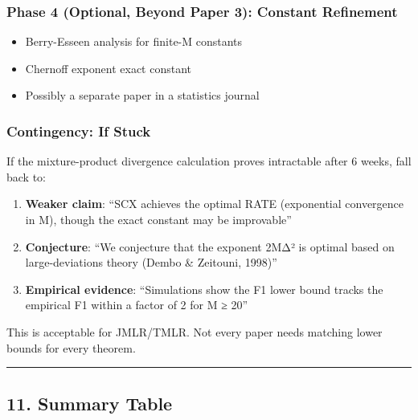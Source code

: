 \documentclass[
  12pt,
]{ctexart}
\providecommand{\tightlist}{%
  \setlength{\itemsep}{0pt}\setlength{\parskip}{0pt}}
\begin{document}
\subsubsection{Phase 4 (Optional, Beyond Paper 3): Constant
Refinement}\label{phase-4-optional-beyond-paper-3-constant-refinement}

\begin{itemize}
\tightlist
\item
  Berry-Esseen analysis for finite-M constants
\item
  Chernoff exponent exact constant
\item
  Possibly a separate paper in a statistics journal
\end{itemize}

\subsubsection{Contingency: If Stuck}\label{contingency-if-stuck}

If the mixture-product divergence calculation proves intractable after 6
weeks, fall back to:

\begin{enumerate}
\def\labelenumi{\arabic{enumi}.}
\tightlist
\item
  \textbf{Weaker claim}: ``SCX achieves the optimal RATE (exponential
  convergence in M), though the exact constant may be improvable''
\item
  \textbf{Conjecture}: ``We conjecture that the exponent 2MΔ² is optimal
  based on large-deviations theory (Dembo \& Zeitouni, 1998)''
\item
  \textbf{Empirical evidence}: ``Simulations show the F1 lower bound
  tracks the empirical F1 within a factor of 2 for M ≥ 20''
\end{enumerate}

This is acceptable for JMLR/TMLR. Not every paper needs matching lower
bounds for every theorem.

\begin{center}\rule{0.5\linewidth}{0.5pt}\end{center}

\subsection{11. Summary Table}\label{summary-table}
\end{document}
